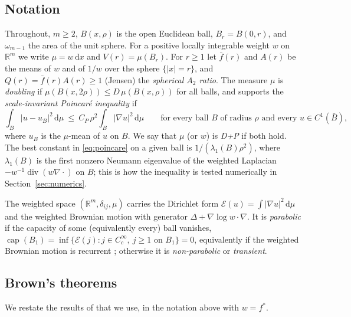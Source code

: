 \documentclass[11pt]{amsart}
\newcommand{\R}{\mathbb{R}}
\newcommand{\dd}{\,\mathrm{d}}
\newcommand{\abs}[1]{\lvert #1\rvert}
\newcommand{\fbar}{\bar f}
\DeclareMathOperator{\capa}{cap}
\DeclareMathOperator{\divg}{div}
\theoremstyle{plain}
\theoremstyle{definition}
\theoremstyle{remark}
\begin{document}
\subsection{Notation}
Throughout, $m\ge2$, $B(x,\rho)$ is the open Euclidean ball, $B_r=B(0,r)$, and
$\omega_{m-1}$ the area of the unit sphere. For a positive locally integrable
weight $w$ on $\R^m$ we write $\mu=w\dd x$ and $V(r)=\mu(B_r)$. For $r\ge1$ let
$\fbar(r)$ and $A(r)$ be the means of $w$ and of $1/w$ over the sphere
$\{\abs x=r\}$, and $Q(r)=\fbar(r)A(r)\ge1$ (Jensen) the \emph{spherical $A_2$
ratio}. The measure $\mu$ is \emph{doubling} if $\mu(B(x,2\rho))\le
D\,\mu(B(x,\rho))$ for all balls, and supports the \emph{scale-invariant
Poincar\'e inequality} if
\begin{equation}\label{eq:poincare}
\int_B\abs{u-u_B}^2\dd\mu\ \le\ C_P\,\rho^2\int_B\abs{\nabla u}^2\dd\mu
\qquad\text{for every ball $B$ of radius $\rho$ and every $u\in C^1(\bar B)$},
\end{equation}
where $u_B$ is the $\mu$-mean of $u$ on $B$. We say that $\mu$ (or $w$) is
\emph{D+P} if both hold. The best constant in \eqref{eq:poincare} on a given
ball is $1/(\lambda_1(B)\rho^2)$, where $\lambda_1(B)$ is the first nonzero
Neumann eigenvalue of the weighted Laplacian $-w^{-1}\divg(w\nabla\cdot)$ on
$B$; this is how the inequality is tested numerically in
Section~\ref{sec:numerics}.

The weighted space $(\R^m,\delta_{ij},\mu)$ carries the Dirichlet form
$\mathcal E(u)=\int\abs{\nabla u}^2\dd\mu$ and the weighted Brownian motion with
generator $\Delta+\nabla\log w\cdot\nabla$. It is \emph{parabolic} if the
capacity of some (equivalently every) ball vanishes,
$\capa(B_1)=\inf\{\mathcal E(j):j\in C_c^\infty,\ j\ge1\text{ on }B_1\}=0$,
equivalently if the weighted Brownian motion is recurrent
\cite[Thm.~5.1]{grigoryan1999}; otherwise it is \emph{non-parabolic} or
\emph{transient}.

\subsection{Brown's theorems}
We restate the results of \cite{brown1971} that we use, in the notation above
with $w=f^*$.
\end{document}
